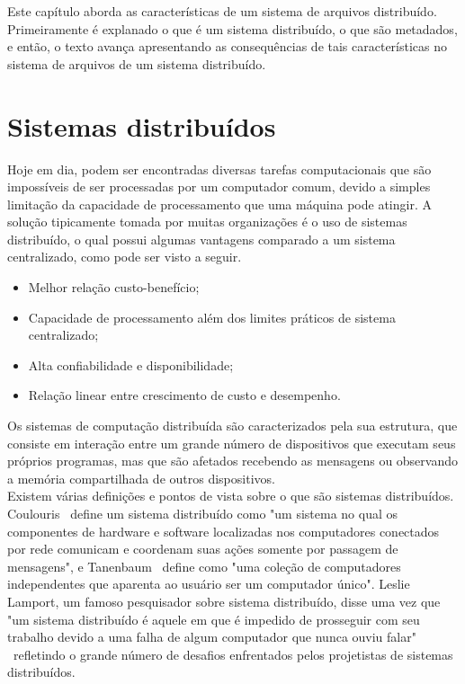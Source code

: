Este capítulo aborda as características de um sistema de arquivos distribuído. Primeiramente é explanado o que é um sistema distribuído, o que são metadados, e então, o texto avança apresentando as consequências de tais características no sistema de arquivos de um sistema distribuído.


	
	\section{Sistemas distribuídos}
	Hoje em dia, podem ser encontradas diversas tarefas computacionais que são impossíveis de ser processadas por um computador comum, devido a simples limitação da capacidade de processamento que uma máquina pode atingir. A solução tipicamente tomada por muitas organizações é o uso de sistemas distribuído, o qual possui algumas vantagens comparado a um sistema centralizado, como pode ser visto a seguir.
	
	\begin{itemize}
		\item Melhor relação custo-benefício;
		\item Capacidade de processamento além dos limites práticos de sistema centralizado;
		\item Alta confiabilidade e disponibilidade;
		\item Relação linear entre crescimento de custo e desempenho.
	\end{itemize}
	Os sistemas de computação distribuída são caracterizados pela sua estrutura, que consiste em interação entre um grande número de dispositivos que executam seus próprios programas, mas que são afetados recebendo as mensagens ou observando a memória compartilhada de outros dispositivos.
	\\
	
	Existem várias definições e pontos de vista sobre o que são sistemas distribuídos. Coulouris~\cite{coulouris06} define um sistema distribuído como "um sistema no qual os componentes de hardware e software localizadas nos computadores conectados por rede comunicam e coordenam suas ações somente por passagem de mensagens", e Tanenbaum~\cite{tanenbaum07} define como "uma coleção de computadores independentes que aparenta ao usuário ser um computador único". Leslie Lamport, um famoso pesquisador sobre sistema distribuído, disse uma vez que "um sistema distribuído é aquele em que é impedido de prosseguir com seu trabalho devido a uma falha de algum computador que nunca ouviu falar" ~refletindo o grande número de desafios enfrentados pelos projetistas de sistemas distribuídos.
	\\
	
